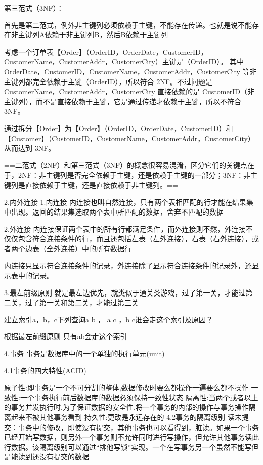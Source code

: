 \documentclass[UTF8]{ctexart}
\begin{document}
第三范式（3NF）：

首先是第二范式，例外非主键列必须依赖于主键，不能存在传递。也就是说不能存在非主键列A依赖于非主键列B，然后B依赖于主键列

考虑一个订单表【Order】（OrderID，OrderDate，CustomerID，CustomerName，CustomerAddr，CustomerCity）主键是（OrderID）。
其中 OrderDate，CustomerID，CustomerName，CustomerAddr，CustomerCity 等非主键列都完全依赖于主键（OrderID），所以符合 2NF。不过问题是 CustomerName，CustomerAddr，CustomerCity 直接依赖的是 CustomerID（非主键列），而不是直接依赖于主键，它是通过传递才依赖于主键，所以不符合 3NF。

通过拆分【Order】为【Order】（OrderID，OrderDate，CustomerID）和【Customer】（CustomerID，CustomerName，CustomerAddr，CustomerCity）从而达到 3NF。

==二范式（2NF）和第三范式（3NF）的概念很容易混淆，区分它们的关键点在于，2NF：非主键列是否完全依赖于主键，还是依赖于主键的一部分；3NF：非主键列是直接依赖于主键，还是直接依赖于非主键列。==

2.内外连接
1.内连接
内连接也叫自然连接，只有两个表相匹配的行才能在结果集中出现。返回的结果集选取两个表中所匹配的数据，舍弃不匹配的数据

2.外连接
内连接保证两个表中的所有行都满足条件，而外连接则不然，外连接不仅仅包含符合连接条件的行，而且还包括左表（左外连接），右表（右外连接），或者两个边表（全外连接）中的所有数据行

内连接只显示符合连接条件的记录，外连接除了显示符合连接条件的记录外，还显示表中的记录。

3.最左前缀原则
就是最左边优先，就类似于通关类游戏，过了第一关，才能过第二关，过了第一关和第二关，才能过第三关

建立索引a，b，c下列查询a b ， a c ，b c谁会走这个索引及原因？

根据最左前缀原则 只有ab会走这个索引

4.事务
事务是数据库中的一个单独的执行单元(unit)

4.1事务的四大特性(ACID)

原子性:即事务是一个不可分割的整体,数据修改时要么都操作一遍要么都不操作
一致性:一个事务执行前后数据库的数据必须保持一致性状态
隔离性:当两个或者以上的事务并发执行时,为了保证数据的安全性,将一个事务的内部的操作与事务操作隔离起来不被其他事务看到
持久性:更改是永远存在的
4.2事务的隔离级别
读未提交：事务中的修改，即使没有提交，其他事务也可以看得到，脏读。如果一个事务已经开始写数据，则另外一个事务则不允许同时进行写操作，但允许其他事务读此行数据。该隔离级别可以通过“排他写锁”实现。一个在写事务另一个虽然不能写但是能读到还没有提交的数据
\end{document}
